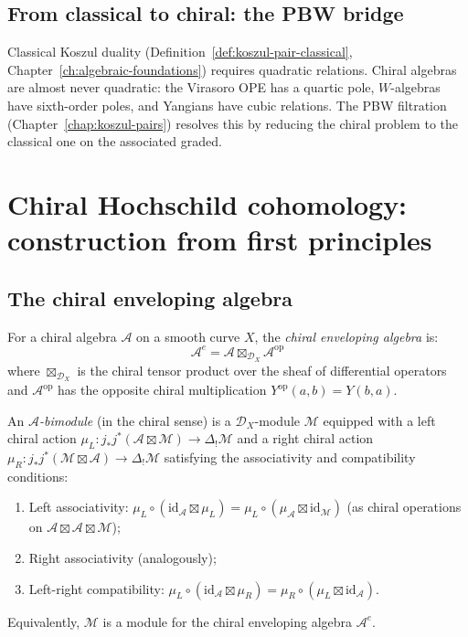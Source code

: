 \subsection{From classical to chiral: the PBW bridge}

Classical Koszul duality (Definition~\ref{def:koszul-pair-classical}, Chapter~\ref{ch:algebraic-foundations}) requires quadratic relations.  Chiral algebras are almost never quadratic: the Virasoro OPE has a quartic pole, $W$-algebras have sixth-order poles, and Yangians have cubic relations.  The PBW filtration (Chapter~\ref{chap:koszul-pairs}) resolves this by reducing the chiral problem to the classical one on the associated graded.


\section{Chiral Hochschild cohomology: construction from first principles}

\subsection{The chiral enveloping algebra}

\begin{definition}
For a chiral algebra $\mathcal{A}$ on a smooth curve $X$, the \emph{chiral enveloping algebra} is:
\[
\mathcal{A}^e = \mathcal{A} \boxtimes_{\mathcal{D}_X} \mathcal{A}^{\text{op}}
\]
where $\boxtimes_{\mathcal{D}_X}$ is the chiral tensor product over the sheaf of differential operators and $\mathcal{A}^{\text{op}}$ has the opposite chiral multiplication $Y^{\text{op}}(a,b) = Y(b,a)$.
\end{definition}

\begin{definition}\label{def:chiral-bimodule}
An \emph{$\mathcal{A}$-bimodule} (in the chiral sense) is a $\mathcal{D}_X$-module $\mathcal{M}$ equipped with a left chiral action $\mu_L\colon j_*j^*(\mathcal{A} \boxtimes \mathcal{M}) \to \Delta_! \mathcal{M}$ and a right chiral action $\mu_R\colon j_*j^*(\mathcal{M} \boxtimes \mathcal{A}) \to \Delta_! \mathcal{M}$ satisfying the associativity and compatibility conditions:
\begin{enumerate}
\item Left associativity: $\mu_L \circ (\mathrm{id}_\mathcal{A} \boxtimes \mu_L) = \mu_L \circ (\mu_\mathcal{A} \boxtimes \mathrm{id}_\mathcal{M})$ (as chiral operations on $\mathcal{A} \boxtimes \mathcal{A} \boxtimes \mathcal{M}$);
\item Right associativity (analogously);
\item Left-right compatibility: $\mu_L \circ (\mathrm{id}_\mathcal{A} \boxtimes \mu_R) = \mu_R \circ (\mu_L \boxtimes \mathrm{id}_\mathcal{A})$.
\end{enumerate}
Equivalently, $\mathcal{M}$ is a module for the chiral enveloping algebra $\mathcal{A}^e$.
\end{definition}

